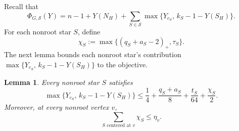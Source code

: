 \documentclass[11pt]{amsart}
\newcommand{\1}{\mathbbm{1}}
\newtheorem{lemma}[theorem]{Lemma}
\begin{document}
Recall that
\[
 \Phi_{G,\mathcal S}(Y)
 =n-1+Y(N_H)
   +\sum_{S\in\mathcal S}
       \max\{Y_{c_S},\,k_S-1-Y(S_H)\}.
\]
For each nonroot star $S$, define
\[
 \chi_S:=\max\{(q_S+a_S-2)_+,\tau_S\}.
\]
The next lemma bounds each nonroot star's contribution
$\max\{Y_{c_S},\,k_S-1-Y(S_H)\}$ to the objective.

\begin{lemma}\label{s12pair:local-charge}
Every nonroot star $S$ satisfies
\[
 \max\{Y_{c_S},\,k_S-1-Y(S_H)\}
 \le\frac14+\frac{q_S+a_S}{8}+\frac{t_S}{64}
       +\frac{\chi_S}{2}.
\]
Moreover, at every nonroot vertex $v$,
\begin{equation}\label{s12pair:vertex-charge}
 \sum_{S\text{ centered at }v}\chi_S\le\eta_v.
\end{equation}
\end{lemma}
\end{document}

